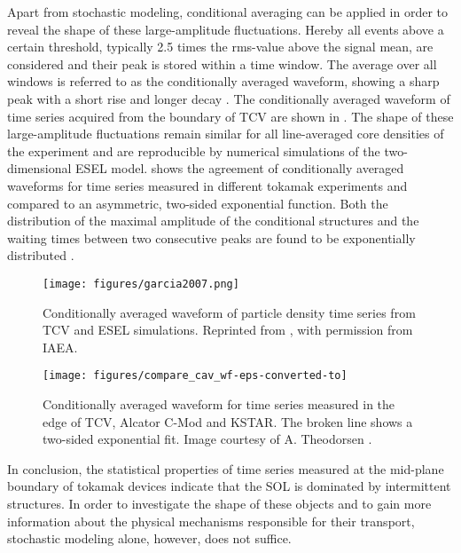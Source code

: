 Apart from stochastic modeling, conditional averaging can be applied in order to reveal the shape of these large-amplitude fluctuations. Hereby all events above a certain threshold, typically 2.5 times the rms-value above the signal mean, are considered and their peak is stored within a time window. The average over all windows is referred to as the conditionally averaged waveform, showing a sharp peak with a short rise and longer decay \cite{antar2003universality,boedo2005edge,garcia2007fluctuations,garcia2007collisionality,garcia2013intermittent,garcia2015intermittent,garcia2017sol,kube2018intermittent,garcia2018intermittent}. The conditionally averaged waveform of time series acquired from the boundary of TCV are shown in . The shape of these large-amplitude fluctuations remain similar for all line-averaged core densities of the experiment and are reproducible by numerical simulations of the two-dimensional ESEL model.  shows the agreement of conditionally averaged waveforms for time series measured in different tokamak experiments and compared to an asymmetric, two-sided exponential function. Both the distribution of the maximal amplitude of the conditional structures and the waiting times between two consecutive peaks are found to be exponentially distributed \cite{antar2005scaling,garcia2015intermittent,kube2018intermittent,garcia2017sol,garcia2018intermittent}.
\begin{figure}
	\centering
	\begin{minipage}{.48\linewidth}
		\texttt{[image: figures/garcia2007.png]}
		\caption{Conditionally averaged waveform of particle density time series from TCV and ESEL simulations. Reprinted from \cite{garcia2007fluctuations}, with permission from IAEA.}
		\label{Fig:garcia2007}
	\end{minipage}
	\hfill
	\begin{minipage}{.48\linewidth}
		\texttt{[image: figures/compare\_cav\_wf-eps-converted-to]}
		\caption{Conditionally averaged waveform for time series measured in the edge of TCV, Alcator C-Mod and KSTAR. The broken line shows a two-sided exponential fit. Image courtesy of A. Theodorsen \cite{theodorsen2018statistical}.}
		\label{Fig:theodorsen_CA}
	\end{minipage}
\end{figure}

In conclusion, the statistical properties of time series measured at the mid-plane boundary of tokamak devices indicate that the SOL is dominated by intermittent structures. In order to investigate the shape of these objects and to gain more information about the physical mechanisms responsible for their transport, stochastic modeling alone, however, does not suffice. 

